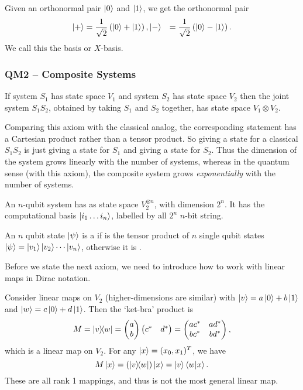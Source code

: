 \documentclass[a4paper]{article}
\begin{document}
\begin{definition}
	Given an orthonormal pair $\ket{0}$ and $\ket{1}$, we get the orthonormal pair
	\begin{align*}
		\ket{+} &= \frac{1}{\sqrt{2}} \left(\ket{0} + \ket{1}\right),
		\ket{-} &= \frac{1}{\sqrt{2}} \left(\ket{0} - \ket{1}\right).
	\end{align*}
	We call this the  basis or $X$-basis.
\end{definition}

\subsubsection{QM2 -- Composite Systems}

\begin{axiom*}[QM2]
	If system $S_1$ has state space $V_1$ and system $S_2$ has state space $V_2$ then the joint system $S_1 S_2$, obtained by taking $S_1$ and $S_2$ together, has state space $V_1 \otimes V_2$.
\end{axiom*}

Comparing this axiom with the classical analog,
the corresponding statement has a Cartesian product rather than a tensor product. So giving a state for a classical $S_1S_2$ is just giving a state for $S_1$ and giving a state for $S_2$. Thus the dimension of the system grows linearly with the number of systems, whereas in the quantum sense (with this axiom), the composite system grows \emph{exponentially} with the number of systems.

\begin{example}
	An $n$-qubit system has as state space $V_2^{\otimes n}$, with dimension $2^n$. It has the computational basis $\ket{i_1 \dots i_n}$, labelled by all $2^n$ $n$-bit string.

	An $n$ qubit state $\ket{\psi}$ is a  if is the tensor product of $n$ single qubit states $\ket{\psi} = \ket{v_1} \ket{v_2} \cdots \ket{v_n}$, otherwise it is .
\end{example}

Before we state the next axiom, we need to introduce how to work with linear maps in Dirac notation.

Consider linear maps on $V_2$ (higher-dimensions are similar) with $\ket{v} = a \ket{0} + b \ket{1}$ and $\ket{w} = c\ket{0} + d\ket{1}$. Then the `ket-bra' product is
$$
M = \op{v}{w} = \begin{pmatrix}
	a \\ b
\end{pmatrix}\begin{pmatrix}
	c^* &  d^*
\end{pmatrix} = \begin{pmatrix}
ac^* & ad^* \\
bc^* &  bd^*
\end{pmatrix},
$$
which is a linear map on $V_2$. For any $\ket{x} = (x_0, x_1)^T$, we have
$$
M \ket{x} = (\op{v}{w}) \ket{x} = \ket{v} \ip{w}{x}.
$$
These are all rank 1 mappings, and thus is not the most general linear map.
\end{document}
